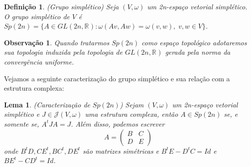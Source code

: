 \documentclass[12pt]{book}
\newtheorem{lema}[teorema]{Lema}
\newtheorem{definicao}[teorema]{Definição}
\newtheorem{observacao}[teorema]{Observação}
\newcommand{\estruturacomplexapadrao}{\mathcal{J}(V, \omega)}
\newcommand{\generalgroup}[2]{GL(#1, #2)}
\newcommand{\generalgroupreal}[1]{\generalgroup{#1}{\real{}}}
\newcommand{\gruposimpletico}[1]{Sp(#1)}
\newcommand{\real}[1]{\mathbb{R}^{#1}}
\begin{document}
	\begin{definicao}
		(Grupo simplético) Seja $(V,\omega)$ um 2n-espaço vetorial simplético. O grupo simplético de $V$ é $\gruposimpletico{2n} = \{A \in \generalgroupreal{2n}: \omega(Av, Aw) = \omega(v, w), \; v,w \in V \}$.
	\end{definicao}
	
	\begin{observacao}
		Quando tratarmos $\gruposimpletico{2n}$ como espaço topológico adotaremos sua topologia induzida pela topologia de $\generalgroupreal{2n}$ gerada pela norma da convergência uniforme.
	\end{observacao}
	
	Vejamos a seguinte caracterização do grupo simplético e sua relação com a estrutura complexa:
	
	\begin{lema}\label{lema_caracterizacao_Sp2n}
		(Caracterização de $Sp(2n)$) Sejam $(V, \omega)$ um 2n-espaço vetorial simplético e $J \in \estruturacomplexapadrao$ uma estrutura complexa, então $A\in Sp(2n)$ se, e somente se, $A^{t}JA = J$. Além disso, podemos escrever 
		$$
		A=
		\left(
		\begin{array}{cc}
		B & C
		\\
		D & E
		\end{array}
		\right)
		$$
		onde $B^{t}D, CE^{t}, BC^{t}, DE^{t} $ são matrizes simétricas e $B^{t}E - D^{t}C = Id$ e $BE^{t} - CD^{t} = Id$.
	\end{lema}
\end{document}
